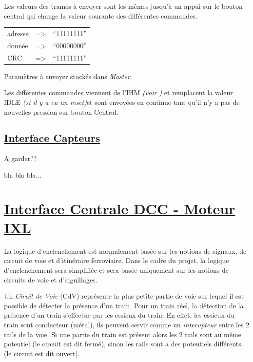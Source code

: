 \medskip
Les valeurs des trames à envoyer sont les mêmes jusqu'à un appui sur
le bouton central qui change la valeur courante des différentes
commandes.


\medskip
\begin{center}
\begin{tabular}{lll}
adresse & => & ``11111111'' \\
donnée  & => & ``00000000'' \\
CRC     & => & ``11111111'' \\
\end{tabular}
\end{center}

\medskip
Paramètres à envoyer stockés dans \emph{Master}.

Les différentes commandes viennent de l'IHM \emph{(voir
  \cite{rapport})}  et remplacent la valeur IDLE \emph{(si il y a eu
  un reset)}et sont envoyées en continue tant qu'il n'y a pas de nouvelles pression sur bouton Central.


\subsection{\underline{Interface Capteurs}}
\label{sec:int_cap}

A garder??

bla bla bla...


\newpage
\section{\underline{Interface Centrale DCC - Moteur IXL}}
\label{sec:int_ixl}   

La logique d'enclenchement est normalement basée sur les notions de signaux, de
circuit de voie et d'itinéraire ferroviaire. Dans le cadre du projet,
la logique d'enclenchement sera simplifiée et sera basée uniquement sur les
notions de circuits de voie et d'aiguillages. 

\medskip
Un \emph{Ciruit de Voie} (CdV) représente la plus petite partie de
voie sur lequel il est possible de détecter la présence d'un
train. Pour un train réel, la détection de la présence d'un train
s'effectue par les essieux du train. En effet, les essieux du train
sont conducteur (métal), ils peuvent servir comme un
\emph{interupteur} entre les 2 rails de la voie. Si une partie du
train est présent alors les 2 rails sont au même potentiel (le circuit
est dit fermé), sinon les rails sont a des potentiels différents (le
circuit est dit ouvert).

